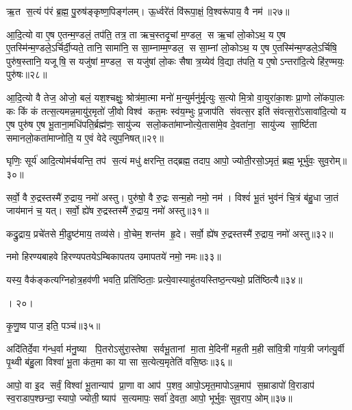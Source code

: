 ऋ॒त स॒त्यं प॑रं ब्र॒ह्म॒ पु॒रुष॑ङ्कृष्ण॒पिङ्ग॑लम्। ऊ॒र्ध्वरे॑तं  वि॑रूपा॒क्षं॒  वि॒श्वरू॑पाय॒ वै नम॑॥२७॥%
\anuvakamend


आ॒दि॒त्यो वा ए॒ष ए॒तन्म॒ण्डलं॒ तप॑ति॒ तत्र॒ ता ऋच॒स्तदृ॒चां म॒ण्डल॒ स ऋ॒चां लो॒कोऽथ॒ य ए॒ष ए॒तस्मि॑न्म॒ण्डले॒ऽर्चिर्दी॒प्यते॒ तानि॒ सामा॑नि॒ स सा॒म्नाम्म॒ण्डल॒ स सा॒म्नां लो॒कोऽथ॒ य ए॒ष ए॒तस्मि॑न्म॒ण्डले॒ऽर्चिषि॒ पुरु॑ष॒स्तानि॒ यजूषि॒ स यजु॑षां म॒ण्डल॒ स यजु॑षां लो॒कः सैषा त्र॒य्येव॑ वि॒द्या त॑पति॒ य ए॒षोऽन्तरा॑दि॒त्ये हि॑र॒ण्मयः॒ पुरु॑षः॥२८॥
\anuvakamend


आ॒दि॒त्यो वै तेज॒ ओजो॒ बलं॒ यश॒श्चक्षुः॒ श्रोत्र॑मा॒त्मा मनो॑ म॒न्युर्मनु॑र्मृ॒त्युः स॒त्यो मि॒त्रो वा॒युरा॑का॒शः प्रा॒णो लो॑कपा॒लः कः किं कं तत्स॒त्यमन्न॒मायु॑र॒मृतो॑ जी॒वो विश्व॑ कत॒मः स्व॑य॒म्भुः प्र॒जाप॑ति संवत्स॒र इति॑ संवत्स॒रो॑ऽसावा॑दि॒त्यो य ए॒ष पुरु॑ष ए॒ष भू॒ताना॒मधि॑पति॒र्ब्रह्म॑णः॒ सायु॑ज्य सलो॒कता॑माप्नोत्ये॒तासा॑मे॒व दे॒वता॑ना॒ सायु॑ज्य सा॒र्ष्टिता समानलो॒कता॑माप्नोति॒ य ए॒वं वेदेत्युप॒निषत्॥२९॥
\anuvakamend


घृणिः॒ सूर्य॑ आदि॒त्योम॑र्चयन्ति॒ तप॑ स॒त्यं मधु॑ क्षरन्ति॒ तद्ब्रह्म॒ तदाप॒ आपो॒ ज्योती॒रसो॒ऽमृतं॒ ब्रह्म॒ भूर्भु॑वः॒ सुव॒रोम्॥३०॥
\anuvakamend


सर्वो॒ वै रु॒द्रस्तस्मै॑ रु॒द्राय॒ नमो॑ अस्तु। पुरु॑षो॒ वै रु॒द्रः सन्म॒हो नमो॒ नम॑। विश्वं॑ भू॒तं भुव॑नं चि॒त्रं ब॑हु॒धा जा॒तं जाय॑मानं च॒ यत्। सर्वो॒ ह्ये॑ष रु॒द्रस्तस्मै॑ रु॒द्राय॒ नमो॑ अस्तु॥३१॥
\anuvakamend


कद्रु॒द्राय॒ प्रचे॑तसे मी॒ढुष्ट॑माय॒ तव्य॑से। वो॒चेम॒ शन्त॑म हृ॒दे। सर्वो॒ ह्ये॑ष रु॒द्रस्तस्मै॑ रु॒द्राय॒ नमो॑ अस्तु॥३२॥
\anuvakamend


नमो हिरण्यबाहवे हिरण्यपतयेऽम्बिकापतय उमापतये॑ नमो॒ नमः॥३३॥
\anuvakamend


यस्य॒ वैक॑ङ्कत्यग्निहोत्र॒हव॑णी भवति॒ प्रति॑ष्ठिताः॒ प्रत्ये॒वास्याहु॑तयस्तिष्ठ॒न्त्यथो॒ प्रति॑ष्ठित्यै॥३४॥

। २०।
\anuvakamend


कृ॒णु॒ष्व पाज॒ इति॒ पञ्च॑॥३५॥
\anuvakamend


अदि॑तिर्दे॒वा ग॑न्ध॒र्वा म॑नु॒ष्या पि॒तरोऽसु॑रा॒स्तेषा सर्वभू॒तानां मा॒ता मे॒दिनी॑ मह॒ती म॒ही सा॑वि॒त्री गा॑य॒त्री जग॑त्यु॒र्वी पृ॒थ्वी ब॑हु॒ला विश्वा॑ भू॒ता क॑त॒मा का या सा स॒त्येत्य॒मृतेति॑ वसि॒ष्ठः॥३६॥
\anuvakamend


आपो॒ वा इ॒द सर्वं॒  विश्वा॑ भू॒तान्याप॑ प्रा॒णा वा आप॑ प॒शव॒ आपो॒ऽमृत॒मापोऽन्न॒माप॑ स॒म्राडापो॑ वि॒राडाप॑ स्व॒राडाप॒श्छन्दा॒स्यापो॒ ज्योती॒ष्याप॑ स॒त्यमापः॒ सर्वा॑ दे॒वता॒ आपो॒ भूर्भुवः॒ सुव॒राप॒ ओम्॥३७॥
\anuvakamend


